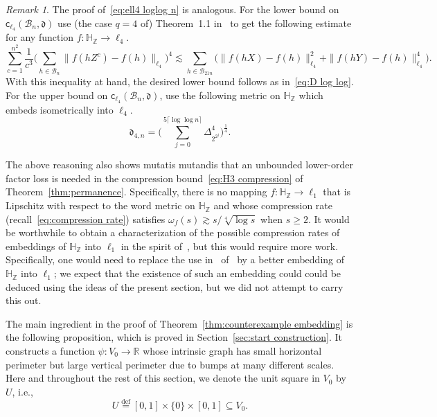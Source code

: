 \documentclass[11pt,reqno]{amsart}
\renewcommand{\H}{\mathbb{H}}
\newcommand{\R}{\mathbb{R}}
\newcommand{\Z}{\mathbb{Z}}
\newcommand{\cc}{{\mathsf{c}}}
\newcommand{\0}{\mathbf{0}}
\renewcommand{\1}{\mathbf 1}
\newcommand{\from}{\colon}
\renewcommand{\subset}{\subseteq}
\newcommand{\eqdef}{\stackrel{\mathrm{def}}{=}}
\renewcommand{\ge}{\geqslant}
\theoremstyle{remark}
\newtheorem{remark}[thm]{Remark}
\begin{document}
\begin{remark}
The proof of~\eqref{eq:ell4 loglog n} is analogous. For the lower bound on $\cc_{\ell_4}(\mathcal{B}_n,\mathfrak{d})$  use (the case $q=4$ of) Theorem~1.1 in~\cite{LafforgueNaor} to get the following estimate for any function $f:\H_\Z\to\ell_4$.
$$
\sum_{c=1}^{n^2} \frac{1}{c^3} \Big( \sum_{h\in \mathcal{B}_n} \|f(hZ^c)-f(h)\|_{\ell_4} \Big)^4 \lesssim
\sum_{h\in \mathcal{B}_{21 n}} \big( \|f(hX)-f(h)\|_{\ell_4}^2+\|f(hY)-f(h)\|_{\ell_4}^4\big).
$$
With this inequality at hand, the desired lower bound follows as in~\eqref{eq:D log log}.  For the upper bound on $\cc_{\ell_4}(\mathcal{B}_n,\mathfrak{d})$, use the following metric on $\H_\Z$ which embeds isometrically into $\ell_4$.
$$
\mathfrak{d}_{4,n}= \bigg(\sum_{j=0}^{5\lceil \log\log n\rceil}\Delta_{2^{2^j}}^4\bigg)^{\frac14}.
$$


The above reasoning also shows mutatis mutandis that an unbounded lower-order factor loss is needed in the compression bound~\eqref{eq:H3 compression} of Theorem~\ref{thm:permanence}. Specifically, there is no mapping $f:\H_\Z\to \ell_1$ that is Lipschitz with respect to the word metric on $\H_\Z$ and whose compression rate (recall~\eqref{eq:compression rate}) satisfies $\omega_f(s)\gtrsim s/\sqrt[4]{\log s}$ when $s\ge 2$. It would be worthwhile to obtain a characterization of the possible compression rates of embeddings of $\H_\Z$ into $\ell_1$ in the spirit of~\cite[Theorem~9]{NY18}, but this would require more work. Specifically, one would need to replace the use in~\cite{NY18} of~\cite[Corollary~5]{Tes08} by a better embedding of $\H_\Z$ into $\ell_1$; we expect that the existence of such an embedding could could be deduced using the ideas of the present section, but we did not attempt to carry this out.
\end{remark}

The main ingredient in the proof of Theorem~\ref{thm:counterexample embedding} is the following proposition, which is proved in Section~\ref{sec:start construction}.  It constructs a function $\psi\from V_0\to \R$ whose intrinsic graph has small horizontal perimeter but large vertical perimeter due to bumps at many different scales.
Here and throughout the rest of this section, we denote the unit square in $V_0$ by $U$, i.e.,
$$U\eqdef [0,1]\times \{0\}\times [0,1]\subset V_0.$$
\end{document}
